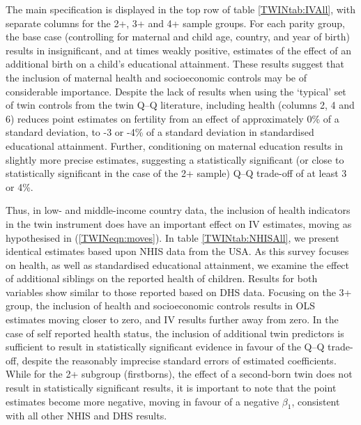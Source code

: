 \documentclass[subeqn]{article}
\begin{document}
\begin{spacing}{1.4}
The main specification is displayed in the top row of table \ref{TWINtab:IVAll}, 
with separate columns for the 2+, 3+ and 4+ sample groups. For each parity 
group, the base case (controlling for maternal and child age, country, and year 
of birth) results in insignificant, and at times weakly positive, estimates of 
the effect of an additional birth on a child's educational attainment. These 
results suggest that the inclusion of maternal health and socioeconomic controls 
may be of considerable importance. Despite the lack of results when using
the `typical' set of twin controls from the twin Q--Q literature, including 
health (columns 2, 4 and 6) reduces point estimates on fertility from an effect 
of approximately 0\% of a standard deviation, to -3 or -4\% of a standard 
deviation in standardised educational attainment. Further, conditioning on 
maternal education results in slightly more precise estimates, suggesting a 
statistically significant (or close to statistically significant in the case
of the 2+ sample) Q--Q trade-off of at least 3 or 4\%.

Thus, in low- and middle-income country data, the inclusion of health 
indicators in the twin instrument does have an important effect on IV 
estimates, moving as hypothesised in (\ref{TWINeqn:moves}).  In table 
\ref{TWINtab:NHISAll}, we present identical estimates based upon NHIS data from
the USA. As this survey focuses on health, as well as standardised educational 
attainment, we examine the effect of additional siblings on the reported health
of children. Results for both variables show similar to those reported based on 
DHS data.  Focusing on the 3+ group, the inclusion of health and socioeconomic 
controls results in OLS estimates moving closer to zero, and IV results further 
away from zero. In the case of self reported health status, the inclusion of 
additional twin predictors is sufficient to result in statistically significant 
evidence in favour of the Q--Q trade-off, despite the reasonably imprecise 
standard errors of estimated coefficients. While for the 2+ subgroup 
(firstborns), the effect of a second-born twin does not result in statistically 
significant results, it is important to note that the point estimates become 
more negative, moving in favour of a negative $\beta_1$, consistent with all 
other NHIS and DHS results.


\end{spacing}
\end{document}

